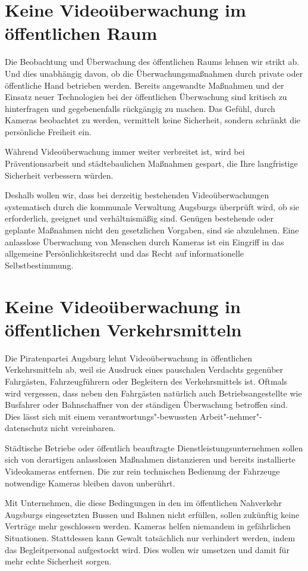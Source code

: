   \section{Keine Videoüberwachung im öffentlichen Raum}
  
  Die Beobachtung und Überwachung des öffentlichen Raums lehnen wir strikt ab. 
  Und dies unabhängig davon, ob die Überwachungsmaßnahmen durch private oder 
  öffentliche Hand betrieben werden. Bereits angewandte Maßnahmen und der 
  Einsatz neuer Technologien bei der öffentlichen Überwachung sind kritisch zu 
  hinterfragen und gegebenenfalls rückgängig zu machen. Das Gefühl, durch 
  Kameras beobachtet zu werden, vermittelt keine Sicherheit, sondern schränkt 
  die persönliche Freiheit ein.
  
  Während Videoüberwachung immer weiter verbreitet ist, wird bei 
  Präventionsarbeit und städtebaulichen Maßnahmen gespart, die Ihre 
  langfristige Sicherheit verbessern würden.
  
  Deshalb wollen wir, dass bei derzeitig bestehenden Videoüberwachungen 
  systematisch durch die kommunale Verwaltung Augsburgs überprüft wird, ob sie 
  erforderlich, geeignet und verhältnismäßig sind. Genügen bestehende oder 
  geplante Maßnahmen nicht den gesetzlichen Vorgaben, sind sie abzulehnen. 
  Eine anlasslose Überwachung von Menschen durch Kameras ist ein Eingriff in 
  das allgemeine Persönlichkeitsrecht und das Recht auf informationelle 
  Selbstbestimmung. 
  
  \section{Keine Videoüberwachung in öffentlichen Verkehrsmitteln}
  
  Die Piratenpartei Augsburg lehnt Videoüberwachung in öffentlichen 
  Verkehrsmitteln ab, weil sie Ausdruck eines pauschalen Verdachts gegenüber 
  Fahrgästen, Fahrzeugführern oder Begleitern des Verkehrsmittels ist. Oftmals 
  wird vergessen, dass neben den Fahrgästen natürlich auch Betriebsangestellte 
  wie Busfahrer oder Bahnschaffner von der ständigen Überwachung betroffen 
  sind. Dies lässt sich mit einem verantwortungs"-bewussten 
  Arbeit"-nehmer"-daten\-schutz nicht vereinbaren.
  
  Städtische Betriebe oder öffentlich beauftragte Dienstleistungsunternehmen 
  sollen sich von derartigen anlasslosen Maßnahmen distanzieren und bereits 
  installierte Videokameras entfernen. Die zur rein technischen Bedienung der 
  Fahrzeuge notwendige Kameras bleiben davon unberührt.
  
  Mit Unternehmen, die diese Bedingungen in den im öffentlichen Nahverkehr 
  Augsburgs eingesetzten Bussen und Bahnen nicht erfüllen, sollen zukünftig 
  keine Verträge mehr geschlossen werden. Kameras helfen niemandem in 
  gefährlichen Situationen. Stattdessen kann Gewalt tatsächlich nur verhindert 
  werden, indem das Begleitpersonal aufgestockt wird. Dies wollen wir umsetzen 
  und damit für mehr echte Sicherheit sorgen. 